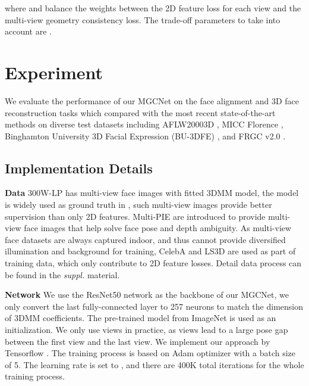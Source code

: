 \documentclass[runningheads]{llncs}
\begin{document}
where  and  balance the weights between the 2D feature loss for each view and the multi-view geometry consistency loss. 
The trade-off parameters to take into account are . \section{Experiment} \label{sec:exp}
We evaluate the performance of our MGCNet on the face alignment and 3D face reconstruction tasks which compared with the most recent state-of-the-art methods \cite{unsuper_zhou2019dense,dataset_bulat2017far_lsw3d,super_fit_stn_bhagavatula2017faster,dataset_aflw20003D_300WLP_zhu2016face, unsuper_mul_sanyal2019learning_ring, super_fit_volu_exp_feng2018joint,unsuper_genova2018unsupervised,super_fit_endtoend_iter_tuan2017regressing,unsuper_mul_ng2019accurate,unsuper_tewari2017mofa,unsuper_mul_tewari2019fml,unsuper_tewari2018self} on diverse test datasets including AFLW20003D \cite{dataset_aflw20003D_300WLP_zhu2016face}, MICC Florence \cite{dataset_florence}, Binghamton University 3D Facial Expression (BU-3DFE) \cite{dataset_bu3dfe_yin20063d,dataset_bu4dfe_yin20063d}, and FRGC v2.0 \cite{dataset_frgc}.

\subsection{Implementation Details}
\textbf{Data}
300W-LP \cite{dataset_aflw20003D_300WLP_zhu2016face} has multi-view face images with fitted 3DMM model, the model is widely used as ground truth in \cite{super_fit_endtoend_iter_tuan2017regressing,super_fit_volu_exp_feng2018joint,super_fit_volu_jackson2017large,super_fit_yi2019mmface}, such multi-view images provide better supervision than only 2D features. Multi-PIE \cite{dataset_gross2010multi} are introduced to provide multi-view face images that help solve face pose and depth ambiguity.
As multi-view face datasets are always captured indoor, and thus cannot provide diversified illumination and background for training, CelebA \cite{dataset_liu2015deep_celeba} and LS3D \cite{dataset_bulat2017far_lsw3d} are used as part of training data, which only contribute to 2D feature losses. Detail data process can be found in the \textit{suppl.} material.


\noindent
\textbf{Network}
We use the ResNet50 \cite{he2016deep} network as the backbone of our MGCNet, we only convert the last fully-connected layer to 257 neurons to match the dimension of 3DMM coefficients.
The pre-trained model from ImageNet \cite{russakovsky2015imagenet} is used as an initialization. We only use  views in practice, as  views lead to a large pose gap between the first view and the last view. We implement our approach by Tensorflow \cite{abadi2016tensorflow}. 
The training process is based on Adam optimizer \cite{kingma2014adam} with a batch size of 5.
The learning rate is set to , and there are 400K total iterations for the whole training process.
\end{document}
